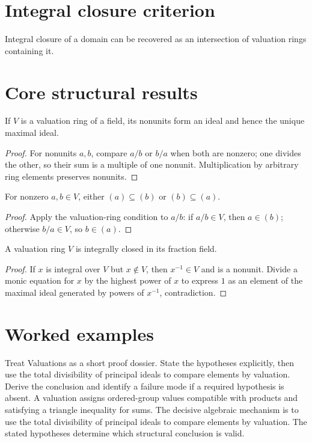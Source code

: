 \section{Integral closure criterion}
Integral closure of a domain can be recovered as an intersection of valuation rings containing it.

\section{Core structural results}

\begin{theorem}\label{thm:v21-01}
If $V$ is a valuation ring of a field, its nonunits form an ideal and hence the unique maximal ideal.
\begin{proof}
For nonunits $a,b$, compare $a/b$ or $b/a$ when both are nonzero; one divides the other, so their sum is a multiple of one nonunit. Multiplication by arbitrary ring elements preserves nonunits.
\end{proof}
\end{theorem}

\begin{theorem}\label{thm:v21-02}
For nonzero $a,b\in V$, either $(a)\subseteq(b)$ or $(b)\subseteq(a)$.
\begin{proof}
Apply the valuation-ring condition to $a/b$: if $a/b\in V$, then $a\in(b)$; otherwise $b/a\in V$, so $b\in(a)$.
\end{proof}
\end{theorem}

\begin{theorem}\label{thm:v21-03}
A valuation ring $V$ is integrally closed in its fraction field.
\begin{proof}
If $x$ is integral over $V$ but $x\notin V$, then $x^{-1}\in V$ and is a nonunit. Divide a monic equation for $x$ by the highest power of $x$ to express $1$ as an element of the maximal ideal generated by powers of $x^{-1}$, contradiction.
\end{proof}
\end{theorem}

\section{Worked examples}

\begin{example}\label{ex:v21-worked-01}
Treat Valuations as a short proof dossier. State the hypotheses explicitly, then use the total divisibility of principal ideals to compare elements by valuation. Derive the conclusion and identify a failure mode if a required hypothesis is absent. A valuation assigns ordered-group values compatible with products and satisfying a triangle inequality for sums. The decisive algebraic mechanism is to use the total divisibility of principal ideals to compare elements by valuation. The stated hypotheses determine which structural conclusion is valid.
\end{example}

